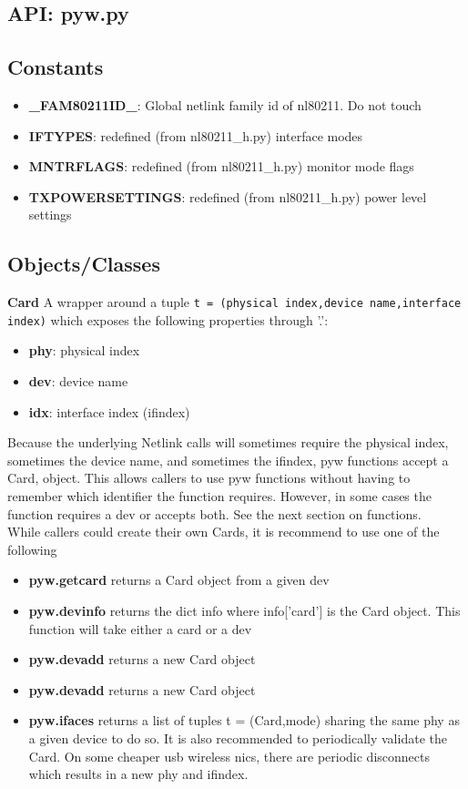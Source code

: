 \documentclass[11pt]{article}
\begin{document}
\begin{appendices}
\section{API: pyw.py}\label{sec:pywapi}

\subsection{Constants}
\begin{itemize}
\item \textbf{\_FAM80211ID\_}: Global netlink family id of nl80211. Do not touch
\item \textbf{IFTYPES}: redefined (from nl80211\_h.py) interface modes
\item \textbf{MNTRFLAGS}: redefined (from nl80211\_h.py) monitor mode flags
\item \textbf{TXPOWERSETTINGS}: redefined (from nl80211\_h.py) power level settings
\end{itemize}

\subsection{Objects/Classes}
\textbf{Card} A wrapper around a tuple 
\texttt{t = (physical index,device name,interface index)}
which exposes the following properties through '.':
\begin{itemize}
\item \textbf{phy}: physical index
\item \textbf{dev}: device name
\item \textbf{idx}: interface index (ifindex)
\end{itemize}
Because the underlying Netlink calls will sometimes require the physical index,
sometimes the device name, and sometimes the ifindex, pyw functions accept a Card,
object. This allows callers to use pyw functions without having to remember which 
identifier the function requires. However, in some cases the function requires 
a dev or accepts both. See the next section on functions.\\

While callers could create their own Cards, it is recommend to use one of the 
following
\begin{itemize}
\item \textbf{pyw.getcard} returns a Card object from a given dev
\item \textbf{pyw.devinfo} returns the dict info where info['card'] is the Card 
object. This function will take either a card or a dev
\item \textbf{pyw.devadd} returns a new Card object
\item \textbf{pyw.devadd} returns a new Card object
\item \textbf{pyw.ifaces} returns a list of tuples t = (Card,mode) sharing the 
same phy as a given device to do so. It is also recommended to periodically 
validate the Card. On some cheaper usb wireless nics, there are periodic 
disconnects which results in a new phy and ifindex.
\end{itemize}


\end{appendices}
\end{document}
